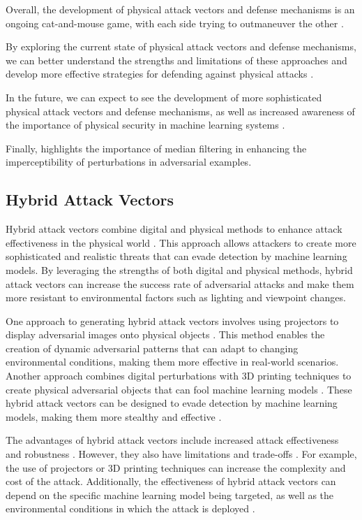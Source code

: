 \documentclass[11pt,a4paper]{article}
\begin{document}
Overall, the development of physical attack vectors and defense mechanisms is an ongoing cat-and-mouse game, with each side trying to outmaneuver the other \cite{doi:10.1109/access.2022.3208131}. 

By exploring the current state of physical attack vectors and defense mechanisms, we can better understand the strengths and limitations of these approaches and develop more effective strategies for defending against physical attacks \cite{doi:10.1109/cvpr42600.2020.00090}. 

In the future, we can expect to see the development of more sophisticated physical attack vectors and defense mechanisms, as well as increased awareness of the importance of physical security in machine learning systems \cite{doi:10.1145/3398394}. 

Finally, \cite{doi:10.3390/electronics13132458} highlights the importance of median filtering in enhancing the imperceptibility of perturbations in adversarial examples.


\subsection{Hybrid Attack Vectors}


Hybrid attack vectors combine digital and physical methods to enhance attack effectiveness in the physical world \cite{doi:10.24963/ijcai.2021/694}. This approach allows attackers to create more sophisticated and realistic threats that can evade detection by machine learning models. By leveraging the strengths of both digital and physical methods, hybrid attack vectors can increase the success rate of adversarial attacks and make them more resistant to environmental factors such as lighting and viewpoint changes.

One approach to generating hybrid attack vectors involves using projectors to display adversarial images onto physical objects \cite{doi:10.1109/cvpr42600.2020.01426}. This method enables the creation of dynamic adversarial patterns that can adapt to changing environmental conditions, making them more effective in real-world scenarios. Another approach combines digital perturbations with 3D printing techniques to create physical adversarial objects that can fool machine learning models \cite{arxiv:1707.07397}. These hybrid attack vectors can be designed to evade detection by machine learning models, making them more stealthy and effective \cite{doi:10.1109/cvpr42600.2020.00108}.

The advantages of hybrid attack vectors include increased attack effectiveness and robustness \cite{arxiv:1707.08945}. However, they also have limitations and trade-offs \cite{arxiv:2203.03818}. For example, the use of projectors or 3D printing techniques can increase the complexity and cost of the attack. Additionally, the effectiveness of hybrid attack vectors can depend on the specific machine learning model being targeted, as well as the environmental conditions in which the attack is deployed \cite{arxiv:1902.06705}.
\end{document}
